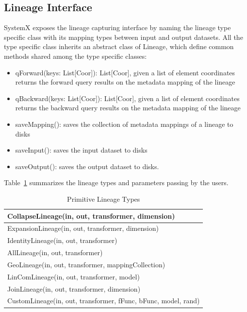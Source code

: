 \documentclass{sig-alternate}
\newenvironment{shortlist}{
        \vspace*{-0.5em}
  \begin{itemize}
  \setlength{\itemsep}{-0.1em}
}{
  \end{itemize}
        \vspace*{-0.5em}
}
\begin{document}
\subsection{Lineage Interface}
\label{sec:Design-Lineage}
SystemX exposes the lineage capturing interface by naming the lineage type specific class with its mapping types between input and output datasets.
All the type specific class inherits an abstract class of Lineage, which define common methods shared among the type specific classes:
\begin{shortlist}
\item{} qForward(keys: List[Coor]): List[Coor], given a list of element coordinates returns the forward query results on the metadata mapping of the lineage
\item{} qBackward(keys: List[Coor]): List[Coor], given a list of element coordinates returns the backward query results on the metadata mapping of the lineage
\item{} saveMapping(): saves the collection of metadata mappings of a lineage to disks
\item{} saveInput(): saves the input dataset to disks
\item{} saveOutput(): saves the output dataset to disks.
\end{shortlist}


Table~\ref{tb:lineage-interface} summarizes the lineage types and parameters passing by the users.
\begin{table}[t]
\begin{center}
    \caption{Primitive Lineage Types}
    \begin{scriptsize}
    \begin{tabular}{ | p{8cm}|}
    \hline
    CollapseLineage(in, out, transformer, dimension) \\ \hline 
    ExpansionLineage(in, out, transformer, dimension) \\ \hline
    IdentityLineage(in, out, transformer) \\ \hline
    AllLineage(in, out, transformer) \\ \hline
    GeoLineage(in, out, transformer, mappingCollection) \\ \hline
    LinComLineage(in, out, transformer, model) \\ \hline
    JoinLineage(in, out, transformer, dimension) \\ \hline
    CustomLineage(in, out, transformer, fFunc, bFunc, model, rand) \\ \hline
    \end{tabular}
    \end{scriptsize}
    \label{tb:lineage-interface}
\end{center}   
\end{table}
\end{document}
